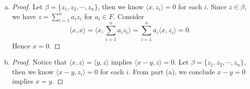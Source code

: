 \begin{Exercise}
\begin{enumerate}[(a)]
\item
\begin{proof}
Let $\beta = \{z_1,z_2,\cdots, z_n\}$, then we know $\langle x, z_i \rangle = 0$ for each $i$. Since $z\in \beta$, we have $z = \sum_{i=1}^{n} a_i z_i$ for $a_i \in F$. Consider
$$
\langle x,x \rangle
= \langle x, \sum_{i=1}^{n} a_i z_i \rangle
= \sum_{i=1}^{n} \overline{a_i} \langle x, z_i \rangle
= 0.
$$
Hence $x=0$.
\end{proof}

\item
\begin{proof}
Notice that $\langle x,z \rangle = \langle y,z \rangle$ implies $\langle x-y, z \rangle = 0$. Let $\beta = \{z_1,z_2,\cdots, z_n\}$, then we know $\langle x-y, z_i \rangle = 0$ for each $i$. From part (a), we conclude $x-y=0$ implies $x=y$.
\end{proof}
\end{enumerate}
\end{Exercise}